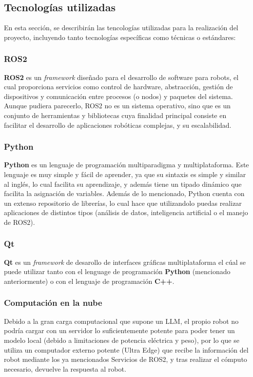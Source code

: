 \documentclass[../main.tex]{subfiles}
\begin{document}
\subsection{Tecnologías utilizadas}
En esta sección, se describirán las tencologías utilizadas para la realización del proyecto, incluyendo tanto tecnologías específicas como técnicas o estándares:

\subsubsection{ROS2}
\textbf{ROS2} es un \textit{framework} diseñado para el desarrollo de software para robots, el cual proporciona servicios como control de hardware,
abstracción, gestión de dispositivos y comunicación entre procesos (o nodos) y paquetes del sistema. Aunque pudiera parecerlo, ROS2 no es un sistema operativo, sino 
que es un conjunto de herramientas y bibliotecas cuya finalidad principal consiste en facilitar el desarrollo de aplicaciones robóticas complejas,
y su escalabilidad.

\subsubsection{Python}
\textbf{Python} es un lenguaje de programación multiparadigma y multiplataforma. Este lenguaje es muy simple y fácil de aprender, ya que su 
sintaxis es simple y similar al inglés, lo cual facilita su aprendizaje, y además tiene un tipado dinámico que facilita la asignación de variables. Además de 
lo mencionado, Python cuenta con un extenso repositorio de librerías, lo cual hace que utilizandolo puedas realizar aplicaciones de distintos tipos (análisis de datos, inteligencia artificial o el
manejo de ROS2).

\subsubsection{Qt}
\textbf{Qt} es un \textit{framework} de desarollo de interfaces gráficas multiplataforma el cúal se puede utilizar tanto con el lenguage de programación \textbf{Python} (mencionado anteriormente) o
con el lenguaje de programación \textbf{C++}.

\subsubsection{Computación en la nube}
Debido a la gran carga computacional que supone un LLM, el propio robot no podría cargar con un servidor lo suficientemente potente para poder tener un modelo local (debido a limitaciones de potencia eléctrica y peso), por lo que se utiliza un computador externo potente (Ultra Edge) que recibe la información del robot mediante los ya mencionados Servicios de ROS2, y tras realizar el cómputo necesario, devuelve la respuesta al robot.
\end{document}
